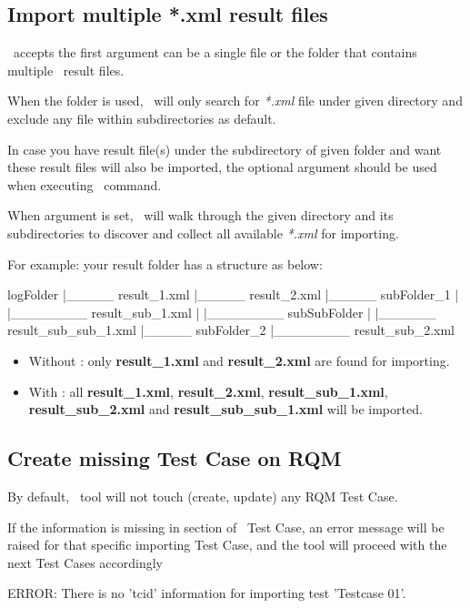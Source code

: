 \subsection{Import multiple *.xml result files}
\pkg\ accepts the first argument  can be a single file or
the folder that contains multiple \rfwcore\ result files.

When the folder is used, \pkg\ will only search for \emph{*.xml} file under
given directory and exclude any file within subdirectories as default.

In case you have result file(s) under the subdirectory of given folder and want
these result files will also be imported, the optional argument
 should be used when executing \pkg\ command.

When  argument is set, \pkg\ will walk through the given
directory and its subdirectories to discover and collect all available
\emph{*.xml} for importing.

For example: your result folder has a structure as below:

\begin{robotlog}
logFolder
   |_____ result_1.xml
   |_____ result_2.xml
   |_____ subFolder_1
   |         |________ result_sub_1.xml
   |         |________ subSubFolder
   |                       |______ result_sub_sub_1.xml
   |_____ subFolder_2
             |________ result_sub_2.xml
\end{robotlog}

\begin{itemize}
\item Without : only \textbf{result\_1.xml} and
      \textbf{result\_2.xml} are found for importing.
\item With : all \textbf{result\_1.xml},
      \textbf{result\_2.xml}, \textbf{result\_sub\_1.xml},
      \textbf{result\_sub\_2.xml} and \textbf{result\_sub\_sub\_1.xml} will
      be imported.
\end{itemize}

\subsection{Create missing Test Case on RQM}
By default, \pkg\ tool will not touch (create, update) any RQM Test Case.

If the  information is missing in \rcode{[Tags]} section of 
\rfwcore\ Test Case, an error message will be raised for that specific importing 
Test Case, and the tool will proceed with the next Test Cases accordingly
\begin{pythonlog}
ERROR: There is no 'tcid' information for importing test 'Testcase 01'.
\end{pythonlog}

